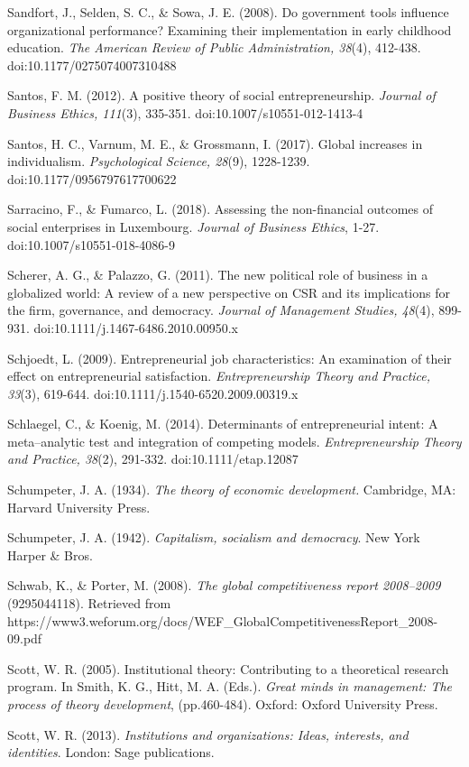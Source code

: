 \documentclass{article}
\begin{document}
Sandfort, J., Selden, S. C., \& Sowa, J. E. (2008). Do government tools influence organizational performance? Examining their implementation in early childhood education. \emph{The American Review of Public Administration, 38}(4), 412-438. doi:10.1177/0275074007310488

Santos, F. M. (2012). A positive theory of social entrepreneurship. \emph{Journal of Business Ethics, 111}(3), 335-351. doi:10.1007/s10551-012-1413-4

Santos, H. C., Varnum, M. E., \& Grossmann, I. (2017). Global increases in individualism. \emph{Psychological Science, 28}(9), 1228-1239. doi:10.1177/0956797617700622

Sarracino, F., \& Fumarco, L. (2018). Assessing the non-financial outcomes of social enterprises in Luxembourg. \emph{Journal of Business Ethics}, 1-27. doi:10.1007/s10551-018-4086-9

Scherer, A. G., \& Palazzo, G. (2011). The new political role of business in a globalized world: A review of a new perspective on CSR and its implications for the firm, governance, and democracy. \emph{Journal of Management Studies, 48}(4), 899-931. doi:10.1111/j.1467-6486.2010.00950.x

Schjoedt, L. (2009). Entrepreneurial job characteristics: An examination of their effect on entrepreneurial satisfaction. \emph{Entrepreneurship Theory and Practice, 33}(3), 619-644. doi:10.1111/j.1540-6520.2009.00319.x

Schlaegel, C., \& Koenig, M. (2014). Determinants of entrepreneurial intent: A meta--analytic test and integration of competing models. \emph{Entrepreneurship Theory and Practice, 38}(2), 291-332. doi:10.1111/etap.12087

Schumpeter, J. A. (1934). \emph{The theory of economic development. }Cambridge, MA: Harvard University Press.

Schumpeter, J. A. (1942). \emph{Capitalism, socialism and democracy}. New York Harper \& Bros.

Schwab, K., \& Porter, M. (2008). \emph{The global competitiveness report 2008--2009} (9295044118). Retrieved from https://www3.weforum.org/docs/WEF\_GlobalCompetitivenessReport\_2008-09.pdf

Scott, W. R. (2005). Institutional theory: Contributing to a theoretical research program. In Smith, K. G., Hitt, M. A. (Eds.). \emph{Great minds in management: The process of theory development}, (pp.460-484). Oxford: Oxford University Press. 

Scott, W. R. (2013). \emph{Institutions and organizations: Ideas, interests, and identities}. London: Sage publications.
\end{document}
